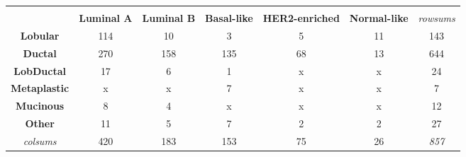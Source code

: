 \begin{table}[!h]
\begin{tabular}{ccccccc}
                \multicolumn{1}{l}{} & \multicolumn{1}{l}{} & \multicolumn{1}{l}{} & \multicolumn{1}{l}{} & \multicolumn{1}{l}{} & \multicolumn{1}{l}{} & \multicolumn{1}{l}{} \\
                \multicolumn{1}{c|}{} & \multicolumn{1}{c|}{\textbf{Luminal A}} & \multicolumn{1}{c|}{\textbf{Luminal B}} & \multicolumn{1}{c|}{\textbf{Basal-like}} & \multicolumn{1}{c|}{\textbf{HER2-enriched}} & \multicolumn{1}{c|}{\textbf{Normal-like}} & {\color[HTML]{9B9B9B} \textit{rowsums}} \\ \hline
                \multicolumn{1}{c|}{\textbf{Lobular}} & \multicolumn{1}{c|}{114} & \multicolumn{1}{c|}{10} & \multicolumn{1}{c|}{3} & \multicolumn{1}{c|}{5} & \multicolumn{1}{c|}{11} & \multicolumn{1}{c|}{{\color[HTML]{656565} 143}} \\ \hline
                \multicolumn{1}{c|}{\textbf{Ductal}} & \multicolumn{1}{c|}{270} & \multicolumn{1}{c|}{158} & \multicolumn{1}{c|}{135} & \multicolumn{1}{c|}{68} & \multicolumn{1}{c|}{13} & \multicolumn{1}{c|}{{\color[HTML]{656565} 644}} \\ \hline
                \multicolumn{1}{c|}{{\color[HTML]{000000} \textbf{LobDuctal}}} & \multicolumn{1}{c|}{17} & \multicolumn{1}{c|}{6} & \multicolumn{1}{c|}{1} & \multicolumn{1}{c|}{{\color[HTML]{656565} x}} & \multicolumn{1}{c|}{{\color[HTML]{656565} x}} & \multicolumn{1}{c|}{{\color[HTML]{656565} 24}} \\ \hline
                \multicolumn{1}{c|}{\textbf{Metaplastic}} & \multicolumn{1}{c|}{{\color[HTML]{656565} x}} & \multicolumn{1}{c|}{{\color[HTML]{656565} x}} & \multicolumn{1}{c|}{7} & \multicolumn{1}{c|}{{\color[HTML]{656565} x}} & \multicolumn{1}{c|}{{\color[HTML]{656565} x}} & \multicolumn{1}{c|}{{\color[HTML]{656565} 7}} \\ \hline
                \multicolumn{1}{c|}{\textbf{Mucinous}} & \multicolumn{1}{c|}{8} & \multicolumn{1}{c|}{4} & \multicolumn{1}{c|}{{\color[HTML]{656565} x}} & \multicolumn{1}{c|}{{\color[HTML]{656565} x}} & \multicolumn{1}{c|}{{\color[HTML]{656565} x}} & \multicolumn{1}{c|}{{\color[HTML]{656565} 12}} \\ \hline
                \multicolumn{1}{c|}{\textbf{Other}} & \multicolumn{1}{c|}{11} & \multicolumn{1}{c|}{5} & \multicolumn{1}{c|}{7} & \multicolumn{1}{c|}{2} & \multicolumn{1}{c|}{2} & \multicolumn{1}{c|}{{\color[HTML]{656565} 27}} \\ \hline
                \multicolumn{1}{c|}{{\color[HTML]{9B9B9B} \textit{colsums}}} & \multicolumn{1}{c|}{{\color[HTML]{656565} 420}} & \multicolumn{1}{c|}{{\color[HTML]{656565} 183}} & \multicolumn{1}{c|}{{\color[HTML]{656565} 153}} & \multicolumn{1}{c|}{{\color[HTML]{656565} 75}} & \multicolumn{1}{c|}{{\color[HTML]{656565} 26}} & \multicolumn{1}{c|}{\textit{857}} \\ \cline{2-7} 

\end{tabular}
\end{table}
